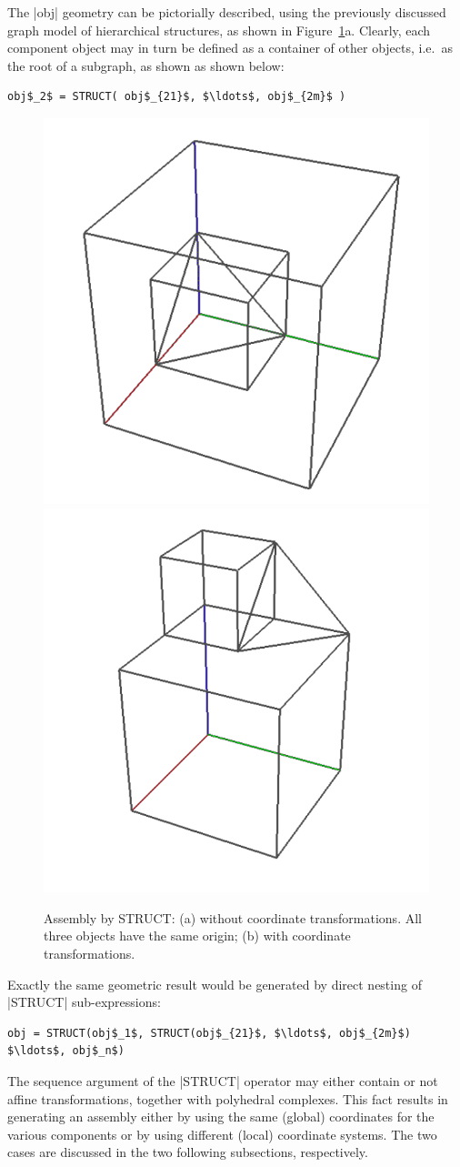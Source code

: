 \begin{coding}
The |obj| geometry can be pictorially described, using the
previously discussed graph model of hierarchical structures, as shown
in Figure~\ref{fig:4:struct1}a.  Clearly, each component object may in
turn be defined as a container of other objects, i.e.~as the root of a
subgraph, as shown as shown below:
\begin{lstlisting}[language=JuliaLocal, style=julia, mathescape=true]
    obj$_2$ = STRUCT( obj$_{21}$, $\ldots$, obj$_{2m}$ )
\end{lstlisting}


\begin{figure}[htbp] %
   \centering
   \includegraphics[width=0.3\linewidth]{chapter-04/figs/global} 
   \includegraphics[width=0.3\linewidth]{chapter-04/figs/local} 
   \caption{Assembly by STRUCT: (a) without coordinate transformations. All three objects have the same origin;
    (b) with coordinate transformations.}
   \label{fig:4:struct1}
\end{figure}

Exactly the same geometric result would be generated by direct nesting of |STRUCT|
sub-expressions:
\begin{lstlisting}[language=JuliaLocal, style=julia, mathescape=true]
obj = STRUCT(obj$_1$, STRUCT(obj$_{21}$, $\ldots$, obj$_{2m}$) $\ldots$, obj$_n$)
\end{lstlisting}


The sequence argument of the |STRUCT| operator may either
contain or not affine transformations, together with polyhedral
complexes.  This fact results in generating an assembly either by
using the same (global) coordinates for the various components or by
using different (local) coordinate systems.  The two cases are
discussed in the two following subsections, respectively.


\end{coding}
